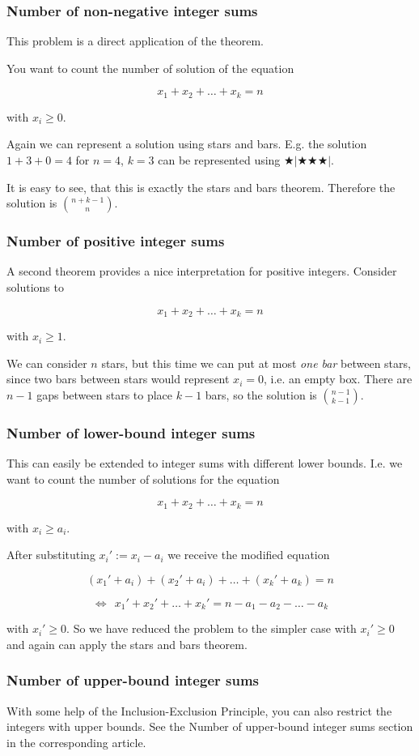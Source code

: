 \subsubsection*{Number of non-negative integer sums}

This problem is a direct application of the theorem.

You want to count the number of solution of the equation 

$$x_1 + x_2 + \dots + x_k = n$$

with $x_i \ge 0$.

Again we can represent a solution using stars and bars.
E.g. the solution $1 + 3 + 0 = 4$ for $n = 4$, $k = 3$ can be represented using $\bigstar | \bigstar \bigstar \bigstar |$.

It is easy to see, that this is exactly the stars and bars theorem.
Therefore the solution is $\binom{n + k - 1}{n}$.

\subsubsection*{Number of positive integer sums}

A second theorem provides a nice interpretation for positive integers. Consider solutions to 

$$x_1 + x_2 + \dots + x_k = n$$

with $x_i \ge 1$.

We can consider $n$ stars, but this time we can put at most \textit{one bar} between stars, since two bars between stars would represent $x_i=0$, i.e. an empty box. 
There are $n-1$ gaps between stars to place $k-1$ bars, so the solution is $\binom{n-1}{k-1}$. 

\subsubsection*{Number of lower-bound integer sums}

This can easily be extended to integer sums with different lower bounds.
I.e. we want to count the number of solutions for  the equation

$$x_1 + x_2 + \dots + x_k = n$$

with $x_i \ge a_i$.

After substituting $x_i' := x_i - a_i$ we receive the modified equation

$$(x_1' + a_i) + (x_2' + a_i) + \dots + (x_k' + a_k) = n$$

$$\Leftrightarrow ~ ~ x_1' + x_2' + \dots + x_k' = n - a_1 - a_2 - \dots - a_k$$

with $x_i' \ge 0$.
So we have reduced the problem to the simpler case with $x_i' \ge 0$ and again can apply the stars and bars theorem.

\subsubsection*{Number of upper-bound integer sums}

With some help of the Inclusion-Exclusion Principle, you can also restrict the integers with upper bounds.
See the Number of upper-bound integer sums section in the corresponding article.
